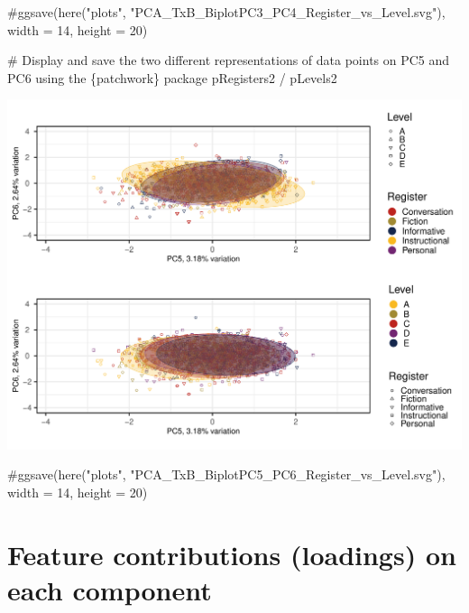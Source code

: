 \documentclass[
  letterpaper,
  DIV=11,
  numbers=noendperiod]{scrreprt}
\newenvironment{Shaded}{\begin{snugshade}}{\end{snugshade}}
\newcommand{\CommentTok}[1]{\textcolor[rgb]{0.37,0.37,0.37}{#1}}
\newcommand{\NormalTok}[1]{\textcolor[rgb]{0.00,0.23,0.31}{#1}}
\newcommand{\SpecialCharTok}[1]{\textcolor[rgb]{0.37,0.37,0.37}{#1}}
\begin{document}
\begin{Shaded}
\begin{Highlighting}[]
\CommentTok{\#ggsave(here("plots", "PCA\_TxB\_BiplotPC3\_PC4\_Register\_vs\_Level.svg"), width = 14, height = 20)}

\CommentTok{\# Display and save the two different representations of data points on PC5 and PC6 using the \{patchwork\} package }
\NormalTok{pRegisters2 }\SpecialCharTok{/}\NormalTok{ pLevels2}
\end{Highlighting}
\end{Shaded}

\includegraphics{E_Ch6_Analysis_files/figure-pdf/PCAtools-biplots-TxB-Levels-2.pdf}

\begin{Shaded}
\begin{Highlighting}[]
\CommentTok{\#ggsave(here("plots", "PCA\_TxB\_BiplotPC5\_PC6\_Register\_vs\_Level.svg"), width = 14, height = 20)}
\end{Highlighting}
\end{Shaded}

\section{Feature contributions (loadings) on each
component}\label{feature-contributions-loadings-on-each-component}
\end{document}
